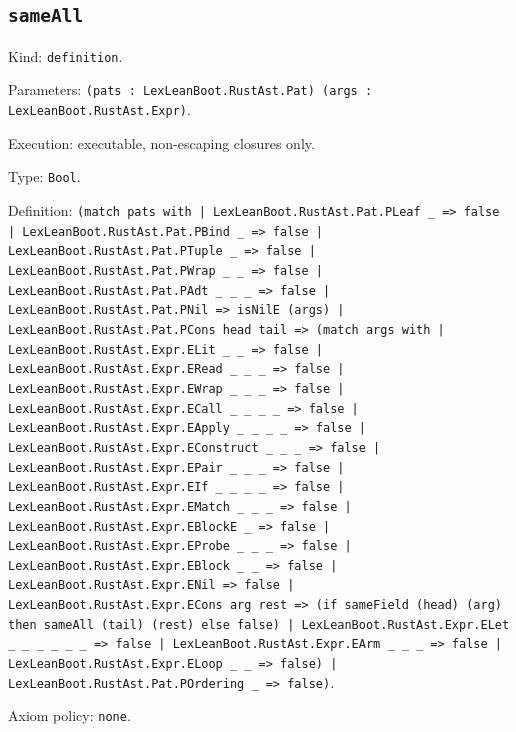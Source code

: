 \documentclass[11pt]{article}
\begin{document}
\subsection*{\texttt{sameAll}}
\noindent Kind: \texttt{definition}.\par
\noindent Parameters: \texttt{(pats : LexLeanBoot.RustAst.Pat) (args : LexLeanBoot.RustAst.Expr)}.\par
\noindent Execution: executable, non-escaping closures only.\par
\noindent Type: \texttt{Bool}.\par
\noindent Definition: \texttt{(match pats with | LexLeanBoot.RustAst.Pat.PLeaf \_ => false | LexLeanBoot.RustAst.Pat.PBind \_ => false | LexLeanBoot.RustAst.Pat.PTuple \_ => false | LexLeanBoot.RustAst.Pat.PWrap \_ \_ => false | LexLeanBoot.RustAst.Pat.PAdt \_ \_ \_ => false | LexLeanBoot.RustAst.Pat.PNil => isNilE (args) | LexLeanBoot.RustAst.Pat.PCons head tail => (match args with | LexLeanBoot.RustAst.Expr.ELit \_ \_ => false | LexLeanBoot.RustAst.Expr.ERead \_ \_ \_ => false | LexLeanBoot.RustAst.Expr.EWrap \_ \_ \_ => false | LexLeanBoot.RustAst.Expr.ECall \_ \_ \_ \_ => false | LexLeanBoot.RustAst.Expr.EApply \_ \_ \_ \_ => false | LexLeanBoot.RustAst.Expr.EConstruct \_ \_ \_ => false | LexLeanBoot.RustAst.Expr.EPair \_ \_ \_ => false | LexLeanBoot.RustAst.Expr.EIf \_ \_ \_ \_ => false | LexLeanBoot.RustAst.Expr.EMatch \_ \_ \_ => false | LexLeanBoot.RustAst.Expr.EBlockE \_ => false | LexLeanBoot.RustAst.Expr.EProbe \_ \_ \_ => false | LexLeanBoot.RustAst.Expr.EBlock \_ \_ => false | LexLeanBoot.RustAst.Expr.ENil => false | LexLeanBoot.RustAst.Expr.ECons arg rest => (if sameField (head) (arg) then sameAll (tail) (rest) else false) | LexLeanBoot.RustAst.Expr.ELet \_ \_ \_ \_ \_ \_ => false | LexLeanBoot.RustAst.Expr.EArm \_ \_ \_ => false | LexLeanBoot.RustAst.Expr.ELoop \_ \_ => false) | LexLeanBoot.RustAst.Pat.POrdering \_ => false)}.\par
\noindent Axiom policy: \texttt{none}.\par
\end{document}
